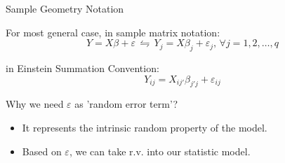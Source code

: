 \begin{point}
    Sample Geometry Notation
\end{point}

    For most general case, in sample matrix notation:
    \begin{equation}
        Y=X\beta+\varepsilon \,\leftrightharpoons\, Y_j=X\beta _j+\varepsilon _j,\,\forall j=1,2,\ldots,q
    \end{equation}
    
    in Einstein Summation Convention:
    \begin{equation}
        Y_{ij}=X_{ij'}\beta _{j'j} +\varepsilon _{ij}
    \end{equation}
    
    Why we need $ \varepsilon $ as 'random error term'?
    \begin{itemize}[topsep=3pt,itemsep=1pt]
        \item It represents the intrinsic random property of the model.
        \item Based on $ \varepsilon  $, we can take r.v. into our statistic model.
    \end{itemize}
    
